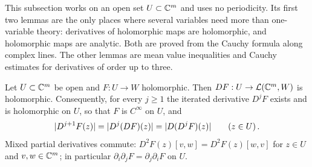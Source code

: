 This subsection works on an open set $U\subset\mathbb{C}^m$ and uses no periodicity. Its first two lemmas are
the only places where several variables need more than one-variable theory: derivatives of
holomorphic maps are holomorphic, and holomorphic maps are analytic. Both are proved from the Cauchy
formula along complex lines. The other lemmas are mean value inequalities and Cauchy estimates for
derivatives of order up to three.

\begin{lemma}\label{bp:p1:holomorphic-regularity}
Let $U\subset\mathbb{C}^m$ be open and $F:U\to W$ holomorphic. Then $DF:U\to\mathcal L(\mathbb{C}^m,W)$ is holomorphic.
Consequently, for every $j\ge1$ the iterated derivative $D^jF$ exists and is holomorphic on $U$, so
that $F$ is $C^\infty$ on $U$, and
\begin{equation*}
\lvert D^{j+1}F(z)\rvert=\lvert D^j(DF)(z)\rvert=\lvert D(D^jF)(z)\rvert\qquad(z\in U)\,.
\end{equation*}
Mixed partial derivatives commute: $D^2F(z)[v,w]=D^2F(z)[w,v]$ for $z\in U$ and $v,w\in\mathbb{C}^m$; in
particular $\partial_i\partial_jF=\partial_j\partial_iF$ on $U$.
\end{lemma}

